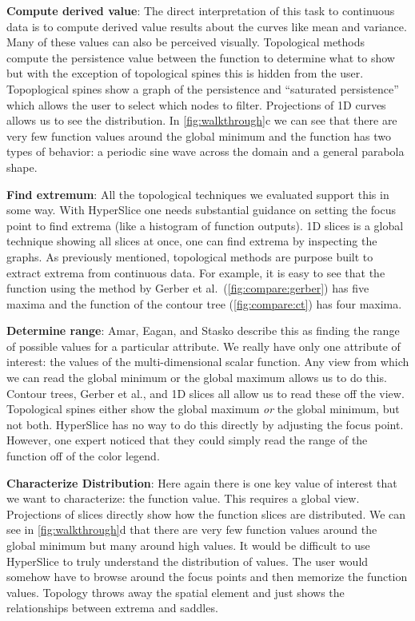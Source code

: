 \textbf{Compute derived value}:\label{compute-derived-value}
The direct interpretation of this task to continuous data is to compute derived
value results about the curves 
like mean and variance. Many of these values can
also be perceived visually.  Topological methods compute the persistence value
between the function to determine what to show but with the exception of
topological spines this is hidden from the user. Topoplogical spines show a
graph of the persistence and ``saturated persistence'' which allows the user
to select which nodes to filter.
Projections of 1D curves allows us to see the distribution.
In
\autoref{fig:walkthrough}c we can see that there are very few function values
around the global minimum and the function has two types of behavior: a
periodic sine wave across the domain and a general parabola shape.

\textbf{Find extremum}:\label{find-extremum}
All the topological techniques we evaluated support this in some
way. With HyperSlice one needs substantial guidance on setting the focus point to find
extrema (like a histogram of function outputs). %
1D slices is a global technique showing all slices at once, one can find
extrema by inspecting the graphs.
As previously mentioned, topological methods are purpose built to extract
extrema from continuous data. For example, it is easy to see that the function
using the method by Gerber et al.\ (\autoref{fig:compare:gerber}) has five
maxima and the function of the contour tree (\autoref{fig:compare:ct}) has four
maxima.

\textbf{Determine range}:\label{determine-range}
Amar, Eagan, and Stasko describe this as finding the range of possible values
for a particular attribute. We really have only one attribute of interest: the
values of the multi-dimensional scalar function. Any view from which we can
read the global minimum or the global maximum allows us to do this. Contour
trees, Gerber et al., and 1D slices all allow us to read these off the view.
Topological spines either show the global maximum \emph{or} the global minimum,
but not both.  HyperSlice has no way to do this directly by adjusting the focus
point.  However, one expert noticed that they could simply read the range of
the function off of the color legend.

\textbf{Characterize Distribution}:
\label{characterize-distribution}
Here again there is one key value of interest that we want to characterize: the
function value.  This requires a global view.  Projections of slices directly
show how the function slices are distributed.  We can see in
\autoref{fig:walkthrough}d that there are very few function values around the
global minimum but many around high values. It would be difficult to use
HyperSlice to truly understand the distribution of values. The user would
somehow have to browse around the focus points and then memorize the function
values. Topology throws away the spatial element and just shows the
relationships between extrema and saddles.


